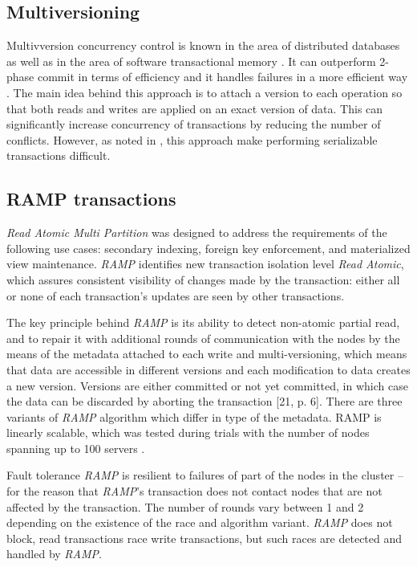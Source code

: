 \documentclass[runningheads,a4paper]{llncs}
\begin{document}
\subsection{Multiversioning} Multivversion concurrency
control \cite{Bernstein:1983} is known in the area of distributed databases as
well as in the area of software transactional memory \cite{Perelman:2010}. It
can outperform 2-phase commit in terms of efficiency and it handles failures in
a more efficient way \cite{Halici:1991}. The main idea behind this approach is 
to attach a version to each operation so that both reads and writes are applied
on an exact version of data. This can significantly increase concurrency of 
transactions by reducing the number of conflicts. However, as noted in 
\cite{Faleiro:2015}, this approach make performing serializable transactions
difficult.

\subsection{RAMP transactions} 
\emph{Read Atomic Multi Partition} \cite{Bailis:2014} was designed to 
address the requirements of the following use cases: secondary indexing, 
foreign key enforcement, and materialized view maintenance.
\emph{RAMP} identifies new transaction isolation level \emph{Read Atomic}, which assures
consistent visibility of changes made by the transaction: either all or none of
each transaction’s updates are seen by other transactions.

The key principle behind \emph{RAMP} is its ability to detect non-atomic partial read,
and to repair it with additional rounds of communication with the nodes by the
means of the metadata attached to each write and multi-versioning, which means
that data are accessible in different versions and each modification to data
creates a new version. Versions are either committed or not yet committed, in
which case the data can be discarded by aborting the transaction [21, p. 6].
There are three variants of \emph{RAMP} algorithm which differ in type of the metadata.
RAMP is linearly scalable, which was tested during trials with the number of 
nodes spanning up to 100 servers \cite[p. 10]{Bailis:2014}.

Fault tolerance \emph{RAMP} is resilient to failures of part of the nodes in the
cluster – for the reason that \emph{RAMP}’s transaction does not contact nodes that are
not affected by the transaction. The number of rounds vary between 1 and 2 
depending on the existence of the race and algorithm variant.  \emph{RAMP} does not block, 
read transactions race write transactions, but such races are detected and handled by 
\emph{RAMP}.
\end{document}
